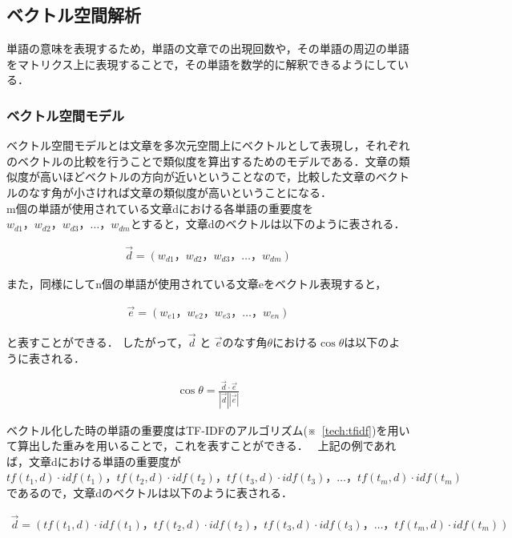 \subsection{ベクトル空間解析}
\label{tech:Vector}
単語の意味を表現するため，単語の文章での出現回数や，その単語の周辺の単語をマトリクス上に表現することで，その単語を数学的に解釈できるようにしている．

\subsubsection{ベクトル空間モデル}
\label{tech:voctorkukan}
ベクトル空間モデルとは文章を多次元空間上にベクトルとして表現し，それぞれのベクトルの比較を行うことで類似度を算出するためのモデルである．文章の類似度が高いほどベクトルの方向が近いということなので，比較した文章のベクトルのなす角が小さければ文章の類似度が高いということになる．\\
m個の単語が使用されている文章dにおける各単語の重要度を$ w_{d1}，w_{d2}，w_{d3}， \ldots ，w_{dm} $とすると，文章dのベクトルは以下のように表される．

\begin{align}
\vec{d} = (w_{d1}，w_{d2}，w_{d3}， \ldots ，w_{dm}) \nonumber
\end{align}

また，同様にしてn個の単語が使用されている文章eをベクトル表現すると，

\begin{align}
\vec{e} = (w_{e1}，w_{e2}，w_{e3}， \ldots ，w_{en}) \nonumber
\end{align}

と表すことができる．
したがって，$ \vec{d} $ と $ \vec{e} $のなす角$ \theta $における$ \cos \theta $は以下のように表される．

\begin{align}
\cos \theta = \frac{\vec{d} \cdot \vec{e}}{|\vec{d}| |\vec{e}|} \nonumber
\end{align}

ベクトル化した時の単語の重要度はTF-IDFのアルゴリズム(※~\ref{tech:tfidf})を用いて算出した重みを用いることで，これを表すことができる．~\cite{voctormodel}
上記の例であれば，文章dにおける単語の重要度が$ tf(t_{1},d) \cdot idf(t_{1})，tf(t_{2},d) \cdot idf(t_{2})，tf(t_{3},d) \cdot idf(t_{3})， \ldots ，tf(t_{m},d) \cdot idf(t_{m}) $
であるので，文章dのベクトルは以下のように表される．

\begin{align}
\vec{d} = (tf(t_{1},d) \cdot idf(t_{1})，tf(t_{2},d) \cdot idf(t_{2})，tf(t_{3},d) \cdot idf(t_{3})， \ldots ，tf(t_{m},d) \cdot idf(t_{m})) \nonumber
\end{align}

